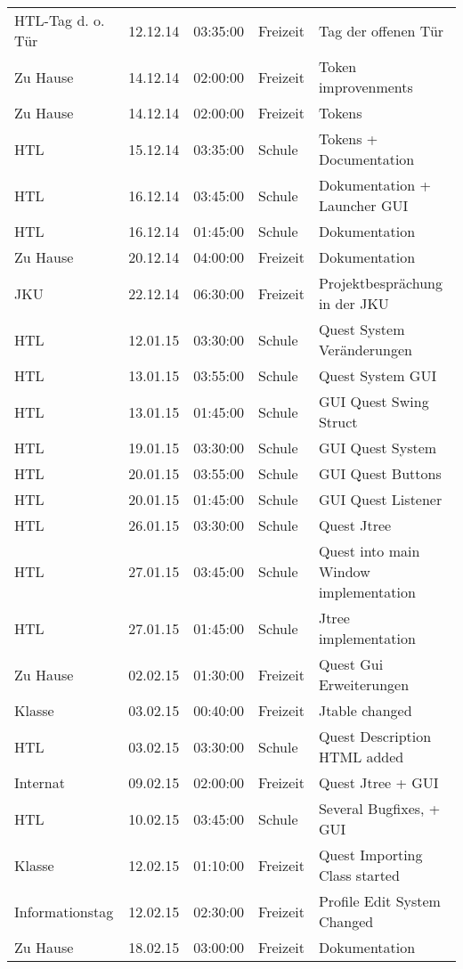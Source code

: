 \begin{small}
\begin{longtable}{ p{} p{} p{} p{} p{}}
HTL-Tag d. o. T\"ur	& 12.12.14	& 03:35:00	& Freizeit	& Tag der offenen T\"ur \\
Zu Hause	& 14.12.14	& 02:00:00	& Freizeit	& Token improvenments \\
Zu Hause	& 14.12.14	& 02:00:00	& Freizeit	& Tokens \\
HTL	& 15.12.14	& 03:35:00	& Schule	& Tokens + Documentation \\
HTL	& 16.12.14	& 03:45:00	& Schule	& Dokumentation + Launcher GUI \\
HTL	& 16.12.14	& 01:45:00	& Schule	& Dokumentation \\
Zu Hause	& 20.12.14	& 04:00:00	& Freizeit	& Dokumentation \\
JKU	& 22.12.14	& 06:30:00	& Freizeit	& Projektbespr\"achung in der JKU \\
HTL	& 12.01.15	& 03:30:00	& Schule	& Quest System Ver\"anderungen \\
HTL	& 13.01.15	& 03:55:00	& Schule	& Quest System GUI \\
HTL	& 13.01.15	& 01:45:00	& Schule	& GUI Quest Swing Struct \\
HTL	& 19.01.15	& 03:30:00	& Schule	& GUI Quest System \\
HTL	& 20.01.15	& 03:55:00	& Schule	& GUI Quest Buttons \\
HTL	& 20.01.15	& 01:45:00	& Schule	& GUI Quest Listener \\
HTL	& 26.01.15	& 03:30:00	& Schule	& Quest Jtree \\
HTL	& 27.01.15	& 03:45:00	& Schule	& Quest into main Window implementation \\
HTL	& 27.01.15	& 01:45:00	& Schule	& Jtree implementation \\
Zu Hause	& 02.02.15	& 01:30:00	& Freizeit	& Quest Gui Erweiterungen \\
Klasse	& 03.02.15	& 00:40:00	& Freizeit	& Jtable changed \\
HTL	& 03.02.15	& 03:30:00	& Schule	& Quest Description HTML added \\
Internat	& 09.02.15	& 02:00:00	& Freizeit	& Quest Jtree + GUI \\
HTL	& 10.02.15	& 03:45:00	& Schule	& Several Bugfixes, + GUI  \\
Klasse	& 12.02.15	& 01:10:00	& Freizeit	& Quest Importing Class started \\
Informationstag	& 12.02.15	& 02:30:00	& Freizeit	& Profile Edit System Changed \\
Zu Hause	& 18.02.15	& 03:00:00	& Freizeit	& Dokumentation \\

\end{longtable}
\end{small}

